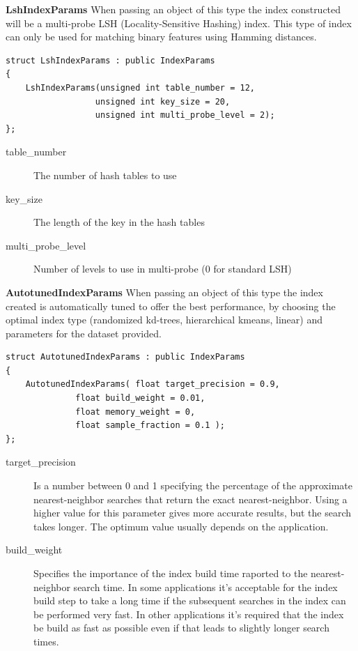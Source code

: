 \documentclass[letter,10pt]{article}
\begin{document}
\begin{description}
\textbf{LshIndexParams} When passing an object of this type the index constructed will be a multi-probe LSH
(Locality-Sensitive Hashing) index. This type of index can only be used for matching binary features using Hamming
distances.
\begin{Verbatim}[fontsize=\footnotesize]
struct LshIndexParams : public IndexParams
{
    LshIndexParams(unsigned int table_number = 12, 
                  unsigned int key_size = 20, 
                  unsigned int multi_probe_level = 2);
};
\end{Verbatim}
\begin{description}
\item[table\_number]{ The number of hash tables to use }
\item[key\_size]{ The length of the key in the hash tables}
\item[multi\_probe\_level] Number of levels to use in multi-probe (0 for standard LSH)
\end{description}


\textbf{AutotunedIndexParams}
  When passing an object of this type the index created is automatically tuned to offer 
the best performance, by choosing the optimal index type (randomized kd-trees, hierarchical kmeans, linear) and parameters for the
dataset provided.
\begin{Verbatim}[fontsize=\footnotesize]
struct AutotunedIndexParams : public IndexParams
{
	AutotunedIndexParams( float target_precision = 0.9,
			  float build_weight = 0.01,
			  float memory_weight = 0,
			  float sample_fraction = 0.1 );
};
\end{Verbatim}
\begin{description}
\item[target\_precision]{ Is a number between 0 and 1 specifying the
percentage of the approximate nearest-neighbor searches that return the
exact nearest-neighbor. Using a higher value for this parameter gives
more accurate results, but the search takes longer. The optimum value
usually depends on the application. }

\item[build\_weight]{ Specifies the importance of the
index build time raported to the nearest-neighbor search time. In some
applications it's acceptable for the index build step to take a long time
if the subsequent searches in the index can be performed very fast. In
other applications it's required that the index be build as fast as
possible even if that leads to slightly longer search times.}


\end{description}
\end{description}
\end{document}
